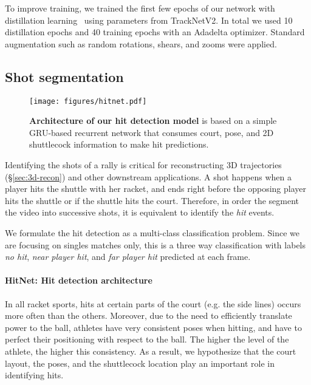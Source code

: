 To improve training, we trained the first few epochs of our network with distillation learning~\cite{HVD15} using parameters from TrackNetV2. In total we used 10 distillation epochs and 40 training epochs with an Adadelta optimizer. Standard augmentation such as random rotations, shears, and zooms were applied.



\subsection{Shot segmentation}
\label{sec:shot_segmentation}
\begin{figure}[ht]
    \centering
    \texttt{[image: figures/hitnet.pdf]}
    \caption{{\bf Architecture of our hit detection model} is based on a simple GRU-based recurrent network that consumes court, pose, and 2D shuttlecock information to make hit predictions.}
    \label{fig:hitnet}
\end{figure}

Identifying the shots of a rally is critical for reconstructing 3D trajectories (\S\ref{sec:3d-recon}) and other downstream applications. A shot happens when a player hits the shuttle with her racket, and ends right before the opposing player hits the shuttle or if the shuttle hits the court. Therefore, in order the segment the video into successive shots, it is equivalent to identify the \emph{hit} events.

We formulate the hit detection as a multi-class classification problem. Since we are focusing on singles matches only, this is a three way classification with labels \emph{no hit}, \emph{near player hit}, and \emph{far player hit} predicted at each frame.

\paragraph{HitNet: Hit detection architecture} In all racket sports, hits at certain parts of the court (e.g. the side lines) occurs more often than the others. Moreover, due to the need to efficiently translate power to the ball, athletes have very consistent poses when hitting, and have to perfect their positioning with respect to the ball. The higher the level of the athlete, the higher this consistency. As a result, we hypothesize that the court layout, the poses, and the shuttlecock location play an important role in identifying hits.

